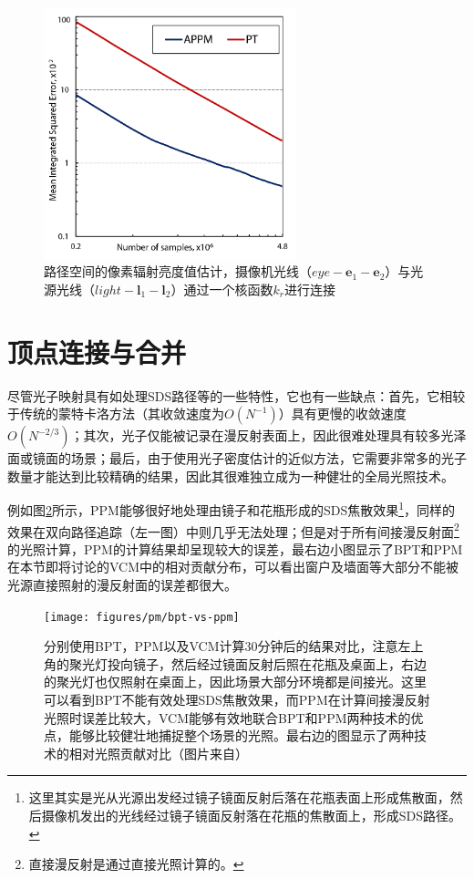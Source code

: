\begin{figure}
	\sidecaption
	\includegraphics[width=0.65\textwidth]{figures/pm/pppm-error}
	\caption{路径空间的像素辐射亮度值估计，摄像机光线（$eye-\mathbf{e}_1-\mathbf{e}_2$）与光源光线（$light-\mathbf{l}_1-\mathbf{l}_2$）通过一个核函数$k_r$进行连接}
	\label{f:pm-pppm-error}
\end{figure}






\section{顶点连接与合并}\label{sec:pm-vcm}
尽管光子映射具有如处理SDS路径等的一些特性，它也有一些缺点：首先，它相较于传统的蒙特卡洛方法（其收敛速度为$O(N^{-1})$）具有更慢的收敛速度$O(N^{-2/3})$；其次，光子仅能被记录在漫反射表面上，因此很难处理具有较多光泽面或镜面的场景；最后，由于使用光子密度估计的近似方法，它需要非常多的光子数量才能达到比较精确的结果，因此其很难独立成为一种健壮的全局光照技术。

例如图\ref{f:pm-bpt-vs-ppm}所示，PPM能够很好地处理由镜子和花瓶形成的SDS焦散效果\footnote{这里其实是光从光源出发经过镜子镜面反射后落在花瓶表面上形成焦散面，然后摄像机发出的光线经过镜子镜面反射落在花瓶的焦散面上，形成SDS路径。}，同样的效果在双向路径追踪（左一图）中则几乎无法处理；但是对于所有间接漫反射面\footnote{直接漫反射是通过直接光照计算的。}的光照计算，PPM的计算结果却呈现较大的误差，最右边小图显示了BPT和PPM在本节即将讨论的VCM中的相对贡献分布，可以看出窗户及墙面等大部分不能被光源直接照射的漫反射面的误差都很大。

\begin{figure}
\begin{fullwidth}	
	\texttt{[image: figures/pm/bpt-vs-ppm]}
	\caption{分别使用BPT，PPM以及VCM计算30分钟后的结果对比，注意左上角的聚光灯投向镜子，然后经过镜面反射后照在花瓶及桌面上，右边的聚光灯也仅照射在桌面上，因此场景大部分环境都是间接光。这里可以看到BPT不能有效处理SDS焦散效果，而PPM在计算间接漫反射光照时误差比较大，VCM能够有效地联合BPT和PPM两种技术的优点，能够比较健壮地捕捉整个场景的光照。最右边的图显示了两种技术的相对光照贡献对比（图片来自\cite{a:LightTransportSimulationwithVertexConnectionandMerging}）}
	\label{f:pm-bpt-vs-ppm}
\end{fullwidth}
\end{figure}


